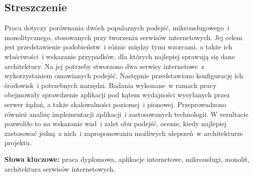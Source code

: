 
\subsection*{Streszczenie}

Praca dotyczy porównania dwóch popularnych podejść, mikrousługowego~i monolitycznego, stosowanych przy tworzeniu serwisów internetowych. Jej celem jest przedstawienie podobieństw~i różnic między tymi wzorcami, a także ich właściwości~i wskazanie przypadków, dla których najlepiej sprawują się dane architektury. Na jej potrzeby stworzono dwa serwisy internetowe~z wykorzystaniem omawianych podejść. Następnie przedstawiono konfigurację ich środowisk~i potrzebnych narzędzi. Badania wykonane~w ramach pracy obejmowały sprawdzenie aplikacji pod kątem wydajności wysyłanych przez serwer żądań, a także skalowalności poziomej~i pionowej. Przeprowadzono również analizę implementacji aplikacji~i zastosowanych technologii. W rezultacie pozwoliło to na wskazanie wad~i zalet obu podejść, ocenie, kiedy najlepiej zastosować jedną~z nich~i zaproponowaniu możliwych ulepszeń~w architekturze projektu.

\vspace{1cm}
\noindent\textbf{Słowa kluczowe:} praca dyplomowa, aplikacje internetowe, mikrousługi, monolit, architektura serwisów internetowych.
